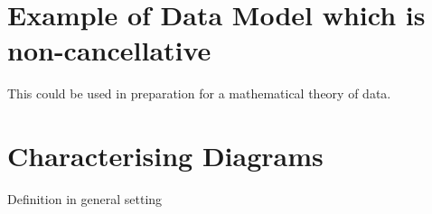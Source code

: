 \documentclass[10pt,a4paper]{scrartcl}
\begin{document}
\section{Example of Data Model which is non-cancellative}
This could be used in preparation for a mathematical theory of data.

\section{Characterising Diagrams}
Definition in general setting


\end{document}
